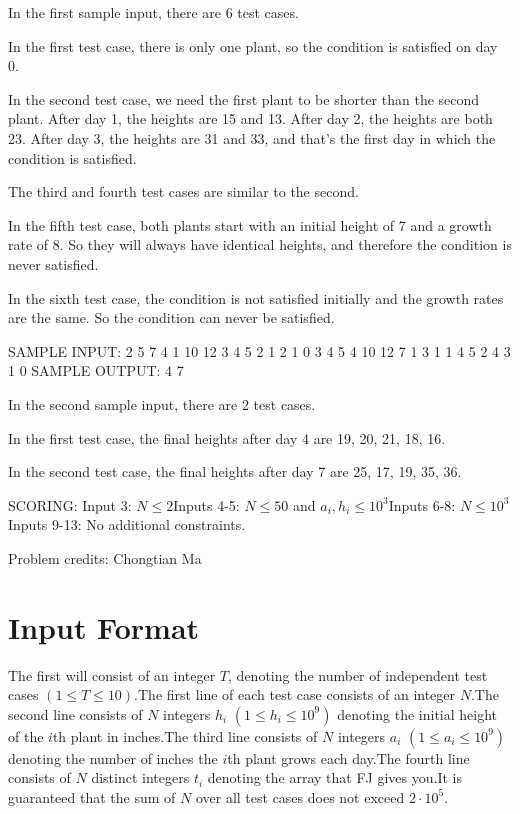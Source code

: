 \documentclass[12pt]{article}
\begin{document}
In the first sample input, there are 6 test cases.

In the first test case, there is only one plant, so the condition is satisfied
on day 0.

In the second test case, we need the first plant to be shorter than the second
plant.  After day 1, the heights are 15 and 13.  After day 2, the heights are
both 23.  After day 3, the heights are 31 and 33, and that's the first day in
which the condition is satisfied.

The third and fourth test cases are similar to the second.

In the fifth test case, both plants start with an initial height of 7 and a
growth rate of 8.  So they will always have identical heights, and therefore the
condition is never satisfied.

In the sixth test case, the condition is not satisfied initially and the growth
rates are the same. So the condition can never be satisfied.

SAMPLE INPUT:
2
5
7 4 1 10 12
3 4 5 2 1
2 1 0 3 4
5
4 10 12 7 1
3 1 1 4 5
2 4 3 1 0
SAMPLE OUTPUT: 
4
7

In the second sample input, there are 2 test cases.

In the first test case, the final heights after day 4 are 19, 20, 21, 18, 16.

In the second test case, the final heights after day 7 are 25, 17, 19, 35, 36.

SCORING:
Input 3: $N \le 2$Inputs 4-5: $N \le 50$ and $a_i, h_i \le 10^3$Inputs 6-8: $N \le 10^3$Inputs 9-13: No additional constraints.


Problem credits: Chongtian Ma



\section*{Input Format}
The first will consist of an integer $T$, denoting the number of independent
test cases $(1 \leq T \leq 10)$.The first line of each test case consists of an integer $N$.The second line consists of $N$ integers $h_i$ $(1 \leq h_i \leq 10^9)$ denoting
the initial height of the $i$th plant in inches.The third line consists of $N$ integers $a_i$ $(1 \leq a_i \leq 10^9)$ denoting
the number of inches the $i$th plant grows each day.The fourth line consists of $N$ distinct integers $t_i$ denoting the array that
FJ gives you.It is guaranteed that the sum of $N$ over all test cases does not exceed
$2\cdot 10^5$.
\end{document}
